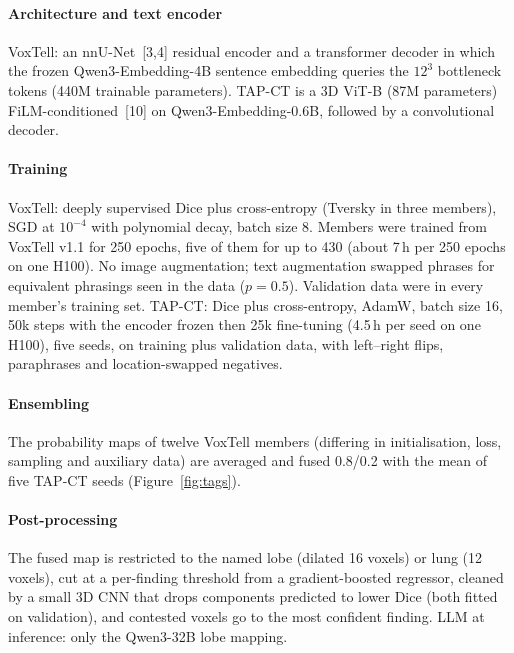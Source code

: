 \paragraph{Architecture and text encoder} VoxTell: an nnU-Net~[3,4] residual encoder and a transformer decoder in which the frozen Qwen3-Embedding-4B sentence embedding queries the $12^3$ bottleneck tokens (440M trainable parameters). TAP-CT is a 3D ViT-B (87M parameters) FiLM-conditioned~[10] on Qwen3-Embedding-0.6B, followed by a convolutional decoder.

\paragraph{Training} VoxTell: deeply supervised Dice plus cross-entropy (Tversky in three members), SGD at $10^{-4}$ with polynomial decay, batch size 8. Members were trained from VoxTell v1.1 for 250 epochs, five of them for up to 430 (about 7\,h per 250 epochs on one H100). No image augmentation; text augmentation swapped phrases for equivalent phrasings seen in the data ($p=0.5$). Validation data were in every member's training set. TAP-CT: Dice plus cross-entropy, AdamW, batch size 16, 50k steps with the encoder frozen then 25k fine-tuning (4.5\,h per seed on one H100), five seeds, on training plus validation data, with left--right flips, paraphrases and location-swapped negatives.

\paragraph{Ensembling} The probability maps of twelve VoxTell members (differing in initialisation, loss, sampling and auxiliary data) are averaged and fused 0.8/0.2 with the mean of five TAP-CT seeds (Figure~\ref{fig:tags}).

\paragraph{Post-processing} The fused map is restricted to the named lobe (dilated 16 voxels) or lung (12 voxels), cut at a per-finding threshold from a gradient-boosted regressor, cleaned by a small 3D CNN that drops components predicted to lower Dice (both fitted on validation), and contested voxels go to the most confident finding. LLM at inference: only the Qwen3-32B lobe mapping.

